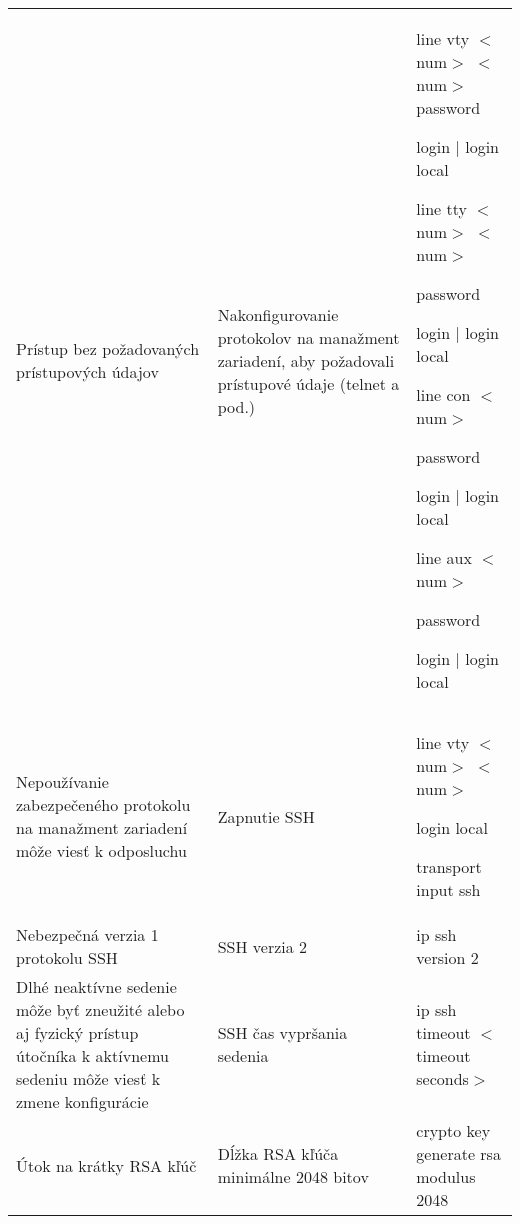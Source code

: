 \begin{longtable}[!htbp]{|L{10em}L{10em}>{\selectfont}L{34em}|}
	
	Prístup bez požadovaných prístupových údajov	&Nakonfigurovanie protokolov na manažment zariadení, aby požadovali prístupové údaje (telnet a pod.)	&line vty $<$num$>$ $<$num$>$
	\hspace{0.5em}password
	
	\hspace{0.5em}login | login local
	
	\vspace{0.5em}line tty $<$num$>$ $<$num$>$
	
	\hspace{0.5em}password
	
	\hspace{0.5em}login | login local
	
	\vspace{0.5em}
	line con $<$num$>$
	
	\hspace{0.5em}password
	
	\hspace{0.5em}login | login local
	
	\vspace{0.5em}line aux $<$num$>$
	
	\hspace{0.5em}password
	
	\hspace{0.5em}login | login local\\
	
	
	
	
	Nepoužívanie zabezpečeného protokolu na manažment zariadení môže viesť k odposluchu	&Zapnutie SSH	&line vty $<$num$>$ $<$num$>$
	
	\hspace{0.5em}login local
	
	\hspace{0.5em}transport input ssh\\
	
	
	
	Nebezpečná verzia 1 protokolu SSH	&SSH verzia 2	&ip ssh version 2\\
	
	
	
	
	Dlhé neaktívne sedenie môže byť zneužité alebo aj fyzický prístup útočníka k aktívnemu sedeniu môže viesť k zmene konfigurácie	&SSH čas vypršania sedenia	&ip ssh timeout $<$timeout seconds$>$\\
	
	
	
	
	Útok na krátky RSA kľúč	&Dĺžka RSA kľúča minimálne 2048 bitov	&crypto key generate rsa modulus 2048\\
	

\end{longtable}
